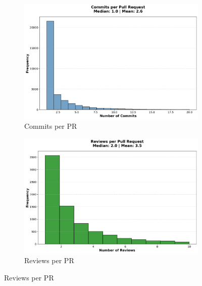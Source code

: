 \documentclass[11pt]{article}
\begin{document}
\begin{figure}[H]
\centering
\begin{subfigure}[b]{0.48\textwidth}
\centering
\includegraphics[width=\textwidth]{figures_individual/10_commits_per_pr_histogram.png}
\caption{Commits per PR}
\label{fig:commits}
\end{subfigure}
\hfill
\begin{subfigure}[b]{0.48\textwidth}
\centering
\includegraphics[width=\textwidth]{figures_individual/13_reviews_per_pr_histogram.png}
\caption{Reviews per PR}
\label{fig:reviews}
\end{subfigure}

\vspace{0.3cm}


\end{figure}
\end{document}

